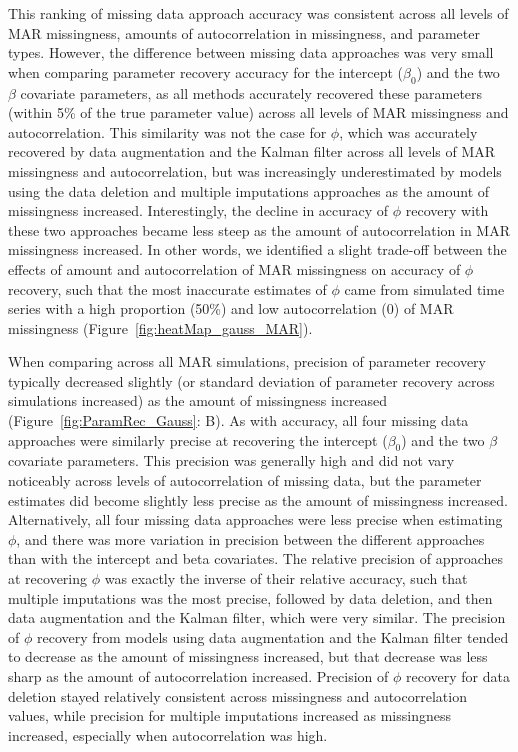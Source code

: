 \documentclass{article}
\begin{document}
This ranking of missing data approach accuracy was consistent across all levels of MAR missingness, amounts of autocorrelation in missingness, and parameter types. However, the difference between missing data approaches was very small when comparing parameter recovery accuracy for the intercept ($\beta_0$) and the two $\beta$ covariate parameters, as all methods accurately recovered these parameters (within 5\% of the true parameter value) across all levels of MAR missingness and autocorrelation. This similarity was not the case for $\phi$, which was accurately recovered by data augmentation and the Kalman filter across all levels of MAR missingness and autocorrelation, but was increasingly underestimated by models using the data deletion and multiple imputations approaches as the amount of missingness increased. Interestingly, the decline in accuracy of $\phi$ recovery with these two approaches became less steep as the amount of autocorrelation in MAR missingness increased. In other words, we identified a slight trade-off between the effects of amount and autocorrelation of MAR missingness on accuracy of $\phi$ recovery, such that the most inaccurate estimates of $\phi$ came from simulated time series with a high proportion (50\%) and low autocorrelation (0) of MAR missingness (Figure~\ref{fig:heatMap_gauss_MAR}). 

When comparing across all MAR simulations, precision of parameter recovery typically decreased slightly (or standard deviation of parameter recovery across simulations increased) as the amount of missingness increased (Figure~\ref{fig:ParamRec_Gauss}: B). As with accuracy, all four missing data approaches were similarly precise at recovering the intercept ($\beta_0$) and the two $\beta$ covariate parameters. This precision was generally high and did not vary noticeably across levels of autocorrelation of missing data, but the parameter estimates did become slightly less precise as the amount of missingness increased. Alternatively, all four missing data approaches were less precise when estimating $\phi$, and there was more variation in precision between the different approaches than with the intercept and beta covariates. The relative precision of approaches at recovering $\phi$ was exactly the inverse of their relative accuracy, such that multiple imputations was the most precise, followed by data deletion, and then data augmentation and the Kalman filter, which were very similar. The precision of $\phi$ recovery from models using data augmentation and the Kalman filter tended to decrease as the amount of missingness increased, but that decrease was less sharp as the amount of autocorrelation increased. Precision of $\phi$ recovery for data deletion stayed relatively consistent across missingness and autocorrelation values, while precision for multiple imputations  increased as missingness increased, especially when autocorrelation was high. 
\end{document}

